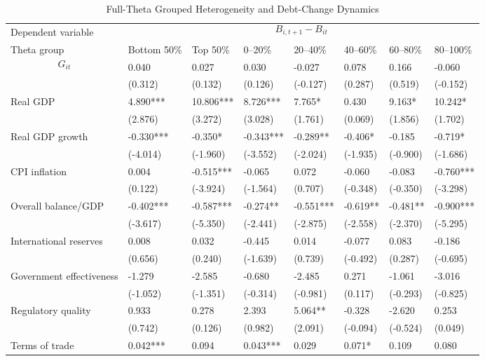 \begin{table}[H]\centering
\begin{threeparttable}
\caption{Full-Theta Grouped Heterogeneity and Debt-Change Dynamics}
\label{tab:theta_group_heterogeneity_debt}
\scriptsize
\begin{tabularx}{\textwidth}{lYYYYYYY}
\toprule
Dependent variable &  \\
\cmidrule(lr){2-8}
Theta group & Bottom 50\% & Top 50\% & 0--20\% & 20--40\% & 40--60\% & 60--80\% & 80--100\% \\
\midrule
$$G_{it}$$ & 0.040 & 0.027 & 0.030 & -0.027 & 0.078 & 0.166 & -0.060 \\
  & (0.312) & (0.132) & (0.126) & (-0.127) & (0.287) & (0.519) & (-0.152) \\
Real GDP & 4.890*** & 10.806*** & 8.726*** & 7.765* & 0.430 & 9.163* & 10.242* \\
  & (2.876) & (3.272) & (3.028) & (1.761) & (0.069) & (1.856) & (1.702) \\
Real GDP growth & -0.330*** & -0.350* & -0.343*** & -0.289** & -0.406* & -0.185 & -0.719* \\
  & (-4.014) & (-1.960) & (-3.552) & (-2.024) & (-1.935) & (-0.900) & (-1.686) \\
CPI inflation & 0.004 & -0.515*** & -0.065 & 0.072 & -0.060 & -0.083 & -0.760*** \\
  & (0.122) & (-3.924) & (-1.564) & (0.707) & (-0.348) & (-0.350) & (-3.298) \\
Overall balance/GDP & -0.402*** & -0.587*** & -0.274** & -0.551*** & -0.619** & -0.481** & -0.900*** \\
  & (-3.617) & (-5.350) & (-2.441) & (-2.875) & (-2.558) & (-2.370) & (-5.295) \\
International reserves & 0.008 & 0.032 & -0.445 & 0.014 & -0.077 & 0.083 & -0.186 \\
  & (0.656) & (0.240) & (-1.639) & (0.739) & (-0.492) & (0.287) & (-0.695) \\
Government effectiveness & -1.279 & -2.585 & -0.680 & -2.485 & 0.271 & -1.061 & -3.016 \\
  & (-1.052) & (-1.351) & (-0.314) & (-0.981) & (0.117) & (-0.293) & (-0.825) \\
Regulatory quality & 0.933 & 0.278 & 2.393 & 5.064** & -0.328 & -2.620 & 0.253 \\
  & (0.742) & (0.126) & (0.982) & (2.091) & (-0.094) & (-0.524) & (0.049) \\
Terms of trade & 0.042*** & 0.094 & 0.043*** & 0.029 & 0.071* & 0.109 & 0.080 \\

\end{tabularx}
\end{threeparttable}
\end{table}
